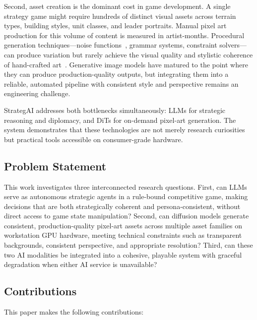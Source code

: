 \documentclass[conference]{IEEEtran}
\begin{document}
Second, asset creation is the dominant cost in game development. A single
strategy game might require hundreds of distinct visual assets across
terrain types, building styles, unit classes, and leader portraits. Manual
pixel art production for this volume of content is measured in
artist-months. Procedural generation techniques---noise
functions~\cite{perlin1985imagesynthesizer}, grammar systems, constraint
solvers---can produce variation but rarely achieve the visual quality and
stylistic coherence of hand-crafted art~\cite{togelius2011searchbased}.
Generative image models have matured to the point where they can produce
production-quality outputs, but integrating them into a reliable, automated
pipeline with consistent style and perspective remains an engineering
challenge.

StrategAI addresses both bottlenecks simultaneously: LLMs for strategic
reasoning and diplomacy, and DiTs for on-demand pixel-art generation. The
system demonstrates that these technologies are not merely research
curiosities but practical tools accessible on consumer-grade hardware.

\subsection{Problem Statement}
\label{sec:problem}

This work investigates three interconnected research questions. First, can
LLMs serve as autonomous strategic agents in a rule-bound competitive game,
making decisions that are both strategically coherent and
persona-consistent, without direct access to game state manipulation?
Second, can diffusion models generate consistent, production-quality
pixel-art assets across multiple asset families on workstation GPU
hardware, meeting technical constraints such as transparent backgrounds,
consistent perspective, and appropriate resolution? Third, can these two AI
modalities be integrated into a cohesive, playable system with graceful
degradation when either AI service is unavailable?

\subsection{Contributions}
\label{sec:contributions}

This paper makes the following contributions:
\end{document}
